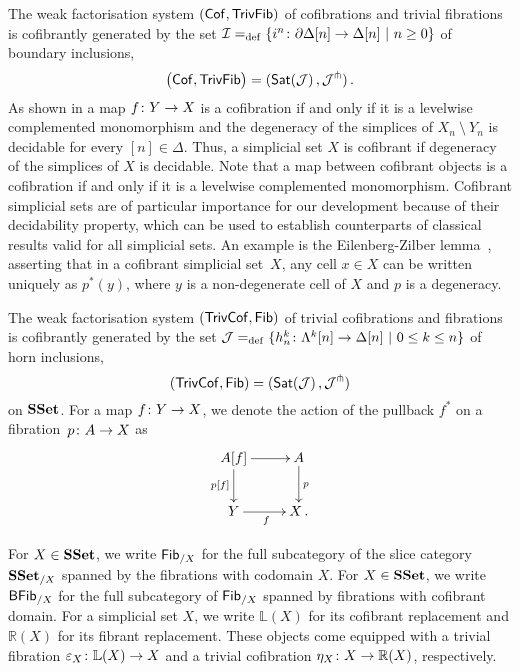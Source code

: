 \documentclass[reqno,10pt,a4paper,oneside,draft]{amsart}
\begin{document}
The weak factorisation system $(\mathsf{Cof}, \mathsf{TrivFib})$ of cofibrations and trivial fibrations  is cofibrantly generated by the set $\mathcal{I} =_{\operatorname{def}} \{ i^n \colon  \partial \Delta[n] \to \Delta[n] \ | \ n \geq 0 \}$  of boundary 
inclusions, \ie 
\[
\big( \mathsf{Cof}, \mathsf{TrivFib} \big) = ( \mathsf{Sat}(\mathcal{J}) \, , \mathcal{J}^\pitchfork) \, .
\]
As shown in \cite[???]{henry2018wms} a map $f \colon Y \to X$ is a cofibration if  and only if 
it is a levelwise complemented monomorphism and the degeneracy of the simplices of $X_n ~\setminus~Y_n$ is decidable for every $[n] \in \Delta$. Thus, a simplicial set $X$ is
cofibrant if  degeneracy of the simplices of $X$ is decidable.
Note that a map between cofibrant objects is a cofibration
if and only if it is a levelwise complemented monomorphism. 
Cofibrant simplicial sets are of particular importance for our development because of their decidability property, which can be used to establish counterparts of classical results valid for all simplicial sets. An example is the Eilenberg-Zilber lemma~\cite[???]
{henry2018wms}, asserting that in a cofibrant simplicial set~$X$, any cell $x \in X$ can be written uniquely as $p^*(y)$, where $y$ is a non-degenerate cell of $X$ and $p$ is a degeneracy. 
\medskip

The weak factorisation system $(\mathsf{TrivCof}, \mathsf{Fib})$ of  trivial cofibrations and fibrations is cofibrantly 
generated by the set $\mathcal{J} =_{\operatorname{def}} \{ h^k_n  \colon \Lambda^k[n] \to \Delta[n]  \ | \ 0 \leq k \leq n \}$ of horn 
inclusions, \ie 
\[
(\mathsf{TrivCof}, \mathsf{Fib}) = ( \mathsf{Sat}(\mathcal{J}) \, , \mathcal{J}^\pitchfork)
\] 
on $\mathbf{SSet}$. For a map $f \colon Y \to X$, we denote the action of the pullback $f^*$ on a fibration~$p \colon A \to X$ as
\[
\xymatrix{
A[f] \ar[r] \ar[d]_{p[f]} & A \ar[d]^{p} \\
Y \ar[r]_f & X \, .}
\]


For $X \in \mathbf{SSet}$, we write $\mathsf{Fib}_{/X}$ for the full subcategory of the slice category $\mathbf{SSet}_{/X}$ spanned by the fibrations with codomain $X$. For $X \in \mathbf{SSet}$, we write $\mathsf{BFib}_{/X}$ for  the full subcategory of  $\mathsf{Fib}_{/X}$ spanned by fibrations with cofibrant domain. For a simplicial set $X$, we write $\mathbb{L}(X)$ for its cofibrant replacement and $\mathbb{R}(X)$ for its
fibrant replacement. These objects come equipped with a trivial fibration $\varepsilon_X \colon \mathbb{L}(X) \to X$ and a trivial cofibration $\eta_X \colon 
X \to \mathbb{R}(X)$, respectively.

\medskip
\end{document}

